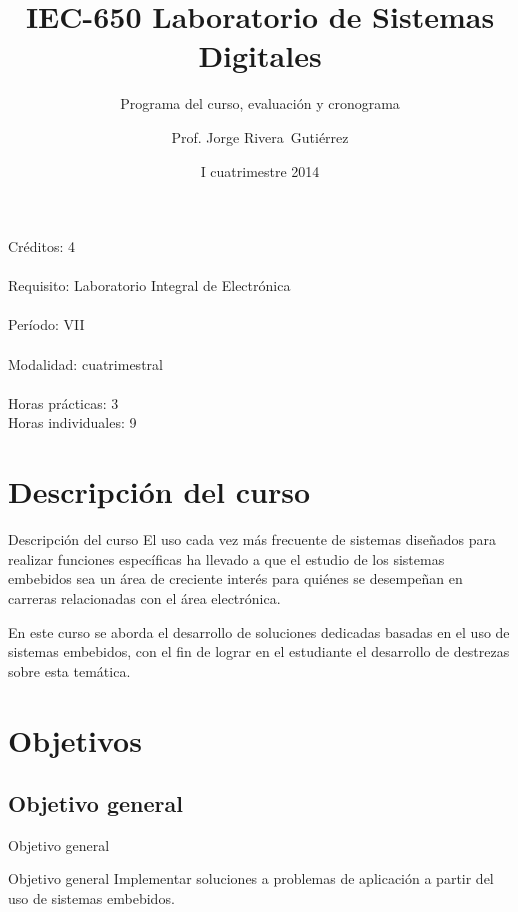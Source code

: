 \documentclass[handout,xcolor=dvipsnames]{beamer}
\title[IEC-650]{IEC-650 Laboratorio de Sistemas Digitales}
\subtitle{Programa del curso, evaluación y cronograma}
\author{Prof. Jorge Rivera~Guti\'errez}
\institute{Universidad Latina de Costa Rica\\ Ingenier\'\i a en Electr\'onica}
\date{I cuatrimestre 2014}
\newcommand{\pageframe}[1]{\frame{\begin{center}{ \Huge #1 }\end{center}}}
\begin{document}
\begin{frame}
 \maketitle
\end{frame}

\begin{frame}
 \begin{center}
  \Large Créditos: 4\\~\\
  Requisito: Laboratorio Integral de Electr\'onica\\~\\
  Período: VII\\~\\
  Modalidad: cuatrimestral\\~\\
  Horas pr\'acticas: 3\\
  Horas individuales: 9
 \end{center}
\end{frame}

\section{Descripción del curso}

\begin{frame}{Descripción del curso}
 El uso cada vez más frecuente de sistemas diseñados para realizar funciones específicas ha llevado a que el estudio de los sistemas embebidos sea un área de creciente interés para quiénes se desempeñan en carreras relacionadas con el área electrónica.

 En este curso se aborda el desarrollo de soluciones dedicadas basadas en el uso de sistemas embebidos, con el fin de lograr en el estudiante el desarrollo de destrezas sobre esta temática.
\end{frame}

\section{Objetivos}

\pageframe{Objetivos}

\subsection{Objetivo general}

\begin{frame}{Objetivo general}
  \begin{block}{Objetivo general}
    Implementar soluciones a problemas de aplicación a partir del uso de sistemas embebidos.
  \end{block}
\end{frame}
\end{document}
